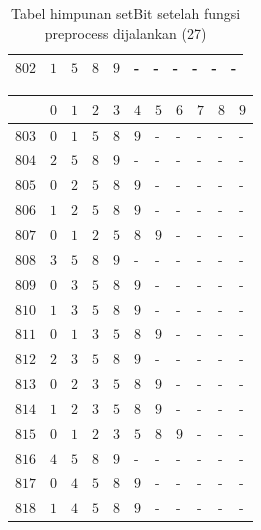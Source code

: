 \begin{appendices}
\begin{table}[H]
\begin{tabular} {|l|l|l|l|l|l|l|l|l|l|l|}
  		$ 802 $ & $ 1 $ &$ 5 $ &$ 8 $ &$ 9 $ & - &  - &  - &  - &  - &  -   \\ \hline  		
  	\end{tabular}\caption{Tabel himpunan setBit setelah fungsi preprocess dijalankan (27)}
  	\label{tab:setbit_27}
  \end{table}
  \begin{table}[H]
  	\centering
  	\begin{tabular} {|l|l|l|l|l|l|l|l|l|l|l|} \hline
  		\backslashbox{$Num$}{$index$} & $ 0 $ & $ 1 $ & $ 2 $ & $ 3 $ & $ 4 $ & $ 5 $ & $ 6 $ & $ 7 $ & $ 8 $ & $ 9 $ \\ \hline
  		$ 803 $ & $ 0 $ &$ 1 $ &$ 5 $ &$ 8 $ &$ 9 $ & - &  - &  - &  - &  -   \\ \hline
  		$ 804 $ & $ 2 $ &$ 5 $ &$ 8 $ &$ 9 $ & - &  - &  - &  - &  - &  -   \\ \hline
  		$ 805 $ & $ 0 $ &$ 2 $ &$ 5 $ &$ 8 $ &$ 9 $ & - &  - &  - &  - &  -   \\ \hline
  		$ 806 $ & $ 1 $ &$ 2 $ &$ 5 $ &$ 8 $ &$ 9 $ & - &  - &  - &  - &  -   \\ \hline
  		$ 807 $ & $ 0 $ &$ 1 $ &$ 2 $ &$ 5 $ &$ 8 $ &$ 9 $ & - &  - &  - &  -   \\ \hline
  		$ 808 $ & $ 3 $ &$ 5 $ &$ 8 $ &$ 9 $ & - &  - &  - &  - &  - &  -   \\ \hline
  		$ 809 $ & $ 0 $ &$ 3 $ &$ 5 $ &$ 8 $ &$ 9 $ & - &  - &  - &  - &  -   \\ \hline
  		$ 810 $ & $ 1 $ &$ 3 $ &$ 5 $ &$ 8 $ &$ 9 $ & - &  - &  - &  - &  -   \\ \hline
  		$ 811 $ & $ 0 $ &$ 1 $ &$ 3 $ &$ 5 $ &$ 8 $ &$ 9 $ & - &  - &  - &  -   \\ \hline
  		$ 812 $ & $ 2 $ &$ 3 $ &$ 5 $ &$ 8 $ &$ 9 $ & - &  - &  - &  - &  -   \\ \hline
  		$ 813 $ & $ 0 $ &$ 2 $ &$ 3 $ &$ 5 $ &$ 8 $ &$ 9 $ & - &  - &  - &  -   \\ \hline
  		$ 814 $ & $ 1 $ &$ 2 $ &$ 3 $ &$ 5 $ &$ 8 $ &$ 9 $ & - &  - &  - &  -   \\ \hline
  		$ 815 $ & $ 0 $ &$ 1 $ &$ 2 $ &$ 3 $ &$ 5 $ &$ 8 $ &$ 9 $ & - &  - &  -   \\ \hline
  		$ 816 $ & $ 4 $ &$ 5 $ &$ 8 $ &$ 9 $ & - &  - &  - &  - &  - &  -   \\ \hline
  		$ 817 $ & $ 0 $ &$ 4 $ &$ 5 $ &$ 8 $ &$ 9 $ & - &  - &  - &  - &  -   \\ \hline
  		$ 818 $ & $ 1 $ &$ 4 $ &$ 5 $ &$ 8 $ &$ 9 $ & - &  - &  - &  - &  -   \\ \hline

\end{tabular}
\end{table}
\end{appendices}
